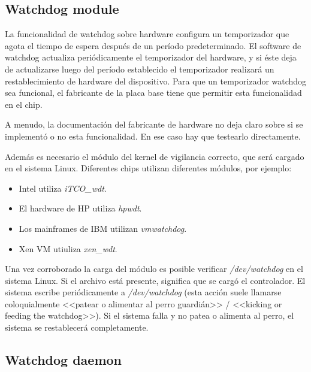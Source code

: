 \documentclass[a4paper, 11pt, titlepage]{book}
\begin{document}
    \subsection{Watchdog module}

        La funcionalidad de watchdog sobre hardware configura un temporizador 
        que agota el tiempo de espera después de un período predeterminado.
        El software de watchdog actualiza periódicamente el temporizador del 
        hardware, y si éste deja de actualizarse luego del período establecido 
        el temporizador realizará un restablecimiento de hardware del dispositivo.
        Para que un temporizador watchdog sea funcional, el fabricante de la placa 
        base tiene que permitir esta funcionalidad en el chip.

        A menudo, la documentación del fabricante de hardware no deja claro 
        sobre si se implementó o no esta funcionalidad. En ese caso hay que 
        testearlo directamente.

        Además es necesario el módulo del kernel de vigilancia correcto, que será 
        cargado en el sistema Linux. Diferentes chips utilizan diferentes módulos,
        por ejemplo:

        \begin{itemize}
            \item Intel utiliza \textit{iTCO\_wdt}.
            \item El hardware de HP utiliza \textit{hpwdt}.
            \item Los mainframes de IBM utilizan \textit{vmwatchdog}.
            \item Xen VM utiuliza \textit{xen\_wdt}.
        \end{itemize}

        Una vez corroborado la carga del módulo es posible verificar \textit{/dev/watchdog}
        en el sistema Linux. Si el archivo está presente, significa que se cargó el controlador.
        El sistema escribe periódicamente a \textit{/dev/watchdog} (esta acción
        suele llamarse coloquialmente <<patear o alimentar al perro guardián>> / <<kicking
        or feeding the watchdog>>). Si el sistema falla y no patea o alimenta al 
        perro, el sistema se restablecerá completamente.

    \subsection{Watchdog daemon}
\end{document}
